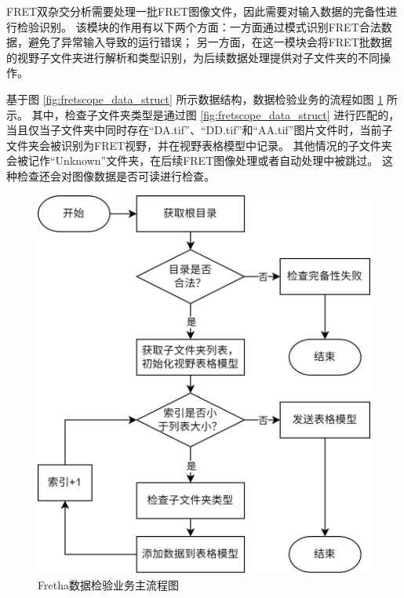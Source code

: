 FRET双杂交分析需要处理一批FRET图像文件，因此需要对输入数据的完备性进行检验识别。
该模块的作用有以下两个方面：一方面通过模式识别FRET合法数据，避免了异常输入导致的运行错误；
另一方面，在这一模块会将FRET批数据的视野子文件夹进行解析和类型识别，为后续数据处理提供对子文件夹的不同操作。

基于图 \ref{fig:fretscope_data_struct} 所示数据结构，数据检验业务的流程如图 \ref{fig:fretha_data_check_flow} 所示。
其中，检查子文件夹类型是通过图 \ref{fig:fretscope_data_struct} 进行匹配的，当且仅当子文件夹中同时存在“DA.tif”、“DD.tif”和“AA.tif”图片文件时，当前子文件夹会被识别为FRET视野，并在视野表格模型中记录。
其他情况的子文件夹会被记作“Unknown”文件夹，在后续FRET图像处理或者自动处理中被跳过。
这种检查还会对图像数据是否可读进行检查。
\begin{figure}[htbp]
    \centering
    \includegraphics[width=0.65\linewidth]{../figures/2/Fretha业务-数据检验.drawio.png}
    \caption{Fretha数据检验业务主流程图}
    \label{fig:fretha_data_check_flow}
\end{figure}

